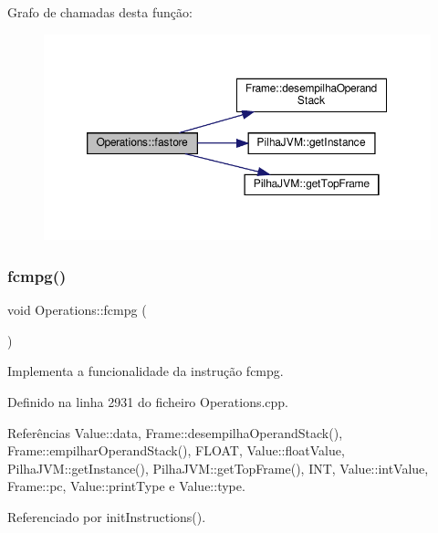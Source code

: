 Grafo de chamadas desta função\+:
\nopagebreak
\begin{figure}[H]
\begin{center}
\leavevmode
\includegraphics[width=350pt]{classOperations_aa8a2c3048379b9d5cdc2b4611ef86190_cgraph}
\end{center}
\end{figure}
\mbox{\label{classOperations_a7825305c331404b97ef209a6e6d988ab}} 
\subsubsection{\texorpdfstring{fcmpg()}{fcmpg()}}
{\footnotesize\ttfamily void Operations\+::fcmpg (\begin{DoxyParamCaption}{ }\end{DoxyParamCaption})\hspace{0.3cm}{\ttfamily [private]}}



Implementa a funcionalidade da instrução fcmpg. 



Definido na linha 2931 do ficheiro Operations.\+cpp.



Referências Value\+::data, Frame\+::desempilha\+Operand\+Stack(), Frame\+::empilhar\+Operand\+Stack(), F\+L\+O\+AT, Value\+::float\+Value, Pilha\+J\+V\+M\+::get\+Instance(), Pilha\+J\+V\+M\+::get\+Top\+Frame(), I\+NT, Value\+::int\+Value, Frame\+::pc, Value\+::print\+Type e Value\+::type.



Referenciado por init\+Instructions().

